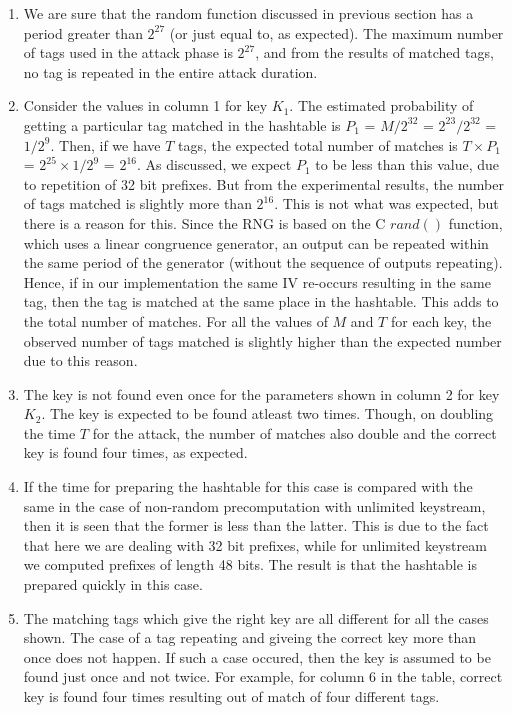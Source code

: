 \begin{enumerate}
\item We are sure that the random function discussed in previous section has a period greater than $2^{27}$ (or just equal to, as expected). The maximum number of tags used in the attack phase is $2^{27}$, and from the results of matched tags, no tag is repeated in the entire attack duration. 

\item Consider the values in column 1 for key $K_1$. The estimated probability of getting a particular tag matched in the hashtable is $P_1$ = $M/2^{32}$ = $2^{23}/2^{32}$ = $1/2^{9}$. Then, if we have $T$ tags, the expected total number of matches is $T \times P_1$ = $2^{25} \times 1/2^{9}$ = $2^{16}$. As discussed, we expect $P_1$ to be less than this value, due to repetition of 32 bit prefixes. But from the experimental results, the number of tags matched is slightly more than $2^{16}$. This is not what was expected, but there is a reason for this.
Since the RNG is based on the C $rand()$ function, which uses a linear congruence generator, an output can be repeated within the same period of the generator (without the sequence of outputs repeating). Hence, if in our implementation the same IV re-occurs resulting in the same tag, then the tag is matched at the same place in the hashtable. This adds to the total number of matches. For all the values of $M$ and $T$ for each key, the observed number of tags matched is slightly higher than the expected number due to this reason.

\item The key is not found even once for the parameters shown in column 2 for key $K_2$. The key is expected to be found atleast two times. Though, on doubling the time $T$ for the attack, the number of matches also double and the correct key is found four times, as expected. 

\item If the time for preparing the hashtable for this case is compared with the same in the case of non-random precomputation with unlimited keystream, then it is seen that the former is less than the latter. This is due to the fact that here we are dealing with 32 bit prefixes, while for unlimited keystream we computed prefixes of length 48 bits. The result is that the hashtable is prepared quickly in this case. 

\item The matching tags which give the right key are all different for all the cases shown. The case of a tag repeating and giveing the correct key more than once does not happen. If such a case occured, then the key is assumed to be found just once and not twice. For example, for column 6 in the table, correct key is found four times resulting out of match of four different tags.
\end{enumerate}